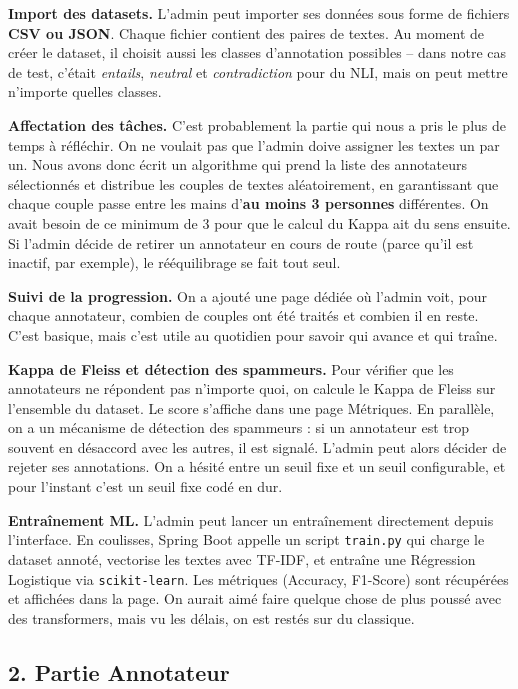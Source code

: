 \documentclass[11pt,a4paper]{article}
\begin{document}
\textbf{Import des datasets.} L'admin peut importer ses données sous forme de fichiers \textbf{CSV ou JSON}. Chaque fichier contient des paires de textes. Au moment de créer le dataset, il choisit aussi les classes d'annotation possibles -- dans notre cas de test, c'était \textit{entails}, \textit{neutral} et \textit{contradiction} pour du NLI, mais on peut mettre n'importe quelles classes.

\textbf{Affectation des tâches.} C'est probablement la partie qui nous a pris le plus de temps à réfléchir. On ne voulait pas que l'admin doive assigner les textes un par un. Nous avons donc écrit un algorithme qui prend la liste des annotateurs sélectionnés et distribue les couples de textes aléatoirement, en garantissant que chaque couple passe entre les mains d'\textbf{au moins 3 personnes} différentes. On avait besoin de ce minimum de 3 pour que le calcul du Kappa ait du sens ensuite. Si l'admin décide de retirer un annotateur en cours de route (parce qu'il est inactif, par exemple), le rééquilibrage se fait tout seul.

\textbf{Suivi de la progression.} On a ajouté une page dédiée où l'admin voit, pour chaque annotateur, combien de couples ont été traités et combien il en reste. C'est basique, mais c'est utile au quotidien pour savoir qui avance et qui traîne.

\textbf{Kappa de Fleiss et détection des spammeurs.} Pour vérifier que les annotateurs ne répondent pas n'importe quoi, on calcule le Kappa de Fleiss sur l'ensemble du dataset. Le score s'affiche dans une page Métriques. En parallèle, on a un mécanisme de détection des spammeurs : si un annotateur est trop souvent en désaccord avec les autres, il est signalé. L'admin peut alors décider de rejeter ses annotations. On a hésité entre un seuil fixe et un seuil configurable, et pour l'instant c'est un seuil fixe codé en dur.

\textbf{Entraînement ML.} L'admin peut lancer un entraînement directement depuis l'interface. En coulisses, Spring Boot appelle un script \texttt{train.py} qui charge le dataset annoté, vectorise les textes avec TF-IDF, et entraîne une Régression Logistique via \texttt{scikit-learn}. Les métriques (Accuracy, F1-Score) sont récupérées et affichées dans la page. On aurait aimé faire quelque chose de plus poussé avec des transformers, mais vu les délais, on est restés sur du classique.

\subsection{2. Partie Annotateur}
\end{document}
